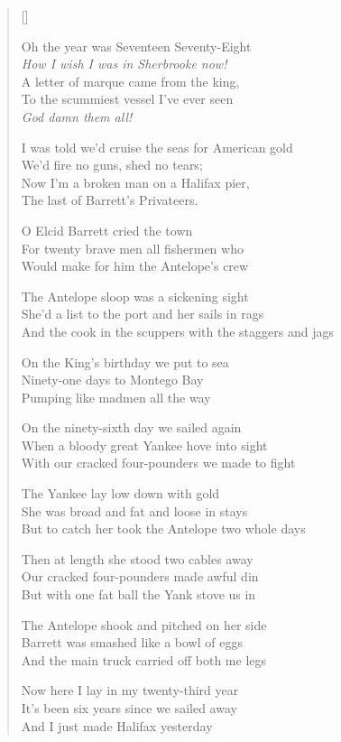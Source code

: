 \pagebreak
\settowidth{\versewidth}{The Antelope sloop was a sickening sight}
\begin{verse}[\versewidth]
\begin{patverse*}
Oh the year was Seventeen Seventy-Eight\\
\textit{How I wish I was in Sherbrooke now!}\\
A letter of marque came from the king,\\
To the scummiest vessel I've ever seen\\
\textit{God damn them all!}
\end{patverse*}

\begin{chorus}
I was told we'd cruise the seas for American gold\\
We'd fire no guns, shed no tears;\\
Now I'm a broken man on a Halifax pier,\\
The last of Barrett's Privateers.
\end{chorus}



O Elcid Barrett cried the town\\
For twenty brave men all fishermen who\\
Would make for him the Antelope's crew

The Antelope sloop was a sickening sight\\
She'd a list to the port and her sails in rags\\
And the cook in the scuppers with the staggers and jags


On the King's birthday we put to sea\\
Ninety-one days to Montego Bay\\
Pumping like madmen all the way

On the ninety-sixth day we sailed again\\
When a bloody great Yankee hove into sight\\
With our cracked four-pounders we made to fight

The Yankee lay low down with gold\\
She was broad and fat and loose in stays\\
But to catch her took the Antelope two whole days

Then at length she stood two cables away\\
Our cracked four-pounders made awful din\\
But with one fat ball the Yank stove us in

The Antelope shook and pitched on her side\\
Barrett was smashed like a bowl of eggs\\
And the main truck carried off both me legs

Now here I lay in my twenty-third year\\
It's been six years since we sailed away\\
And I just made Halifax yesterday

\end{verse}
